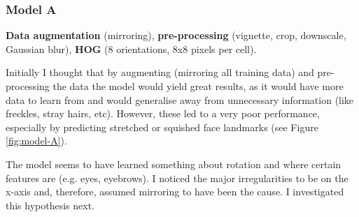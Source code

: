 \documentclass{article}
\begin{document}
\subsubsection{Model A}
\textbf{Data augmentation} (mirroring), \textbf{pre-processing} (vignette, crop, downscale, Gaussian blur), \textbf{HOG} (8 orientations, 8x8 pixels per cell).

Initially I thought that by augmenting (mirroring all training data) and pre-processing the data the model would yield great results, as it would have more data to learn from and would generalise away from unnecessary information (like freckles, stray hairs, etc). However, these led to a very poor performance, especially by predicting stretched or squished face landmarks (see Figure \ref{fig:model-A}).

The model seems to have learned something about rotation and where certain features are (e.g. eyes, eyebrows). I noticed the major irregularities to be on the x-axis and, therefore, assumed mirroring to have been the cause. I investigated this hypothesis next.
\end{document}
